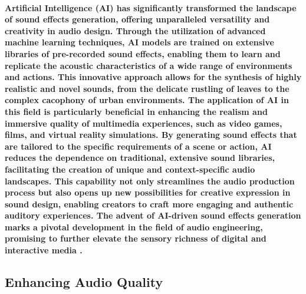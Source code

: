 \documentclass[11pt,a4paper,oneside]{report}
\begin{document}
\paragraph{Artificial Intelligence (AI) has significantly transformed the landscape of sound effects generation, offering unparalleled versatility and creativity in audio design. Through the utilization of advanced machine learning techniques, AI models are trained on extensive libraries of pre-recorded sound effects, enabling them to learn and replicate the acoustic characteristics of a wide range of environments and actions. This innovative approach allows for the synthesis of highly realistic and novel sounds, from the delicate rustling of leaves to the complex cacophony of urban environments. The application of AI in this field is particularly beneficial in enhancing the realism and immersive quality of multimedia experiences, such as video games, films, and virtual reality simulations. By generating sound effects that are tailored to the specific requirements of a scene or action, AI reduces the dependence on traditional, extensive sound libraries, facilitating the creation of unique and context-specific audio landscapes. This capability not only streamlines the audio production process but also opens up new possibilities for creative expression in sound design, enabling creators to craft more engaging and authentic auditory experiences. The advent of AI-driven sound effects generation marks a pivotal development in the field of audio engineering, promising to further elevate the sensory richness of digital and interactive media \cite{greshler2021catch}.}
\subsection{Enhancing Audio Quality}
\end{document}
